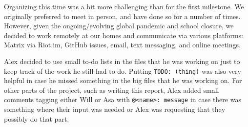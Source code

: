 \documentclass{article}
\begin{document}
Organizing this time was a bit more challenging than for the first milestone. We originally preferred to meet in person, and have done so for a number of times.
However, given the ongoing/evolving global pandemic and school closure, we decided to work remotely at
our homes and communicate via various platforms: Matrix via Riot.im,
GitHub issues, email, text messaging, and online meetings.

Alex decided to use small to-do lists in the files that he was working on just
to keep track of the work he still had to do. Putting \verb|TODO: (thing)|
was also very helpful in case he missed something in the big files that he was
working on. For other parts of the project, such as writing this report, Alex
added small comments tagging either Will or Asa with \verb|@<name>: message| in
case there was something where their input was needed or Alex was requesting that
they possibly do that part.


\nocite{*}

{}

\end{document}
